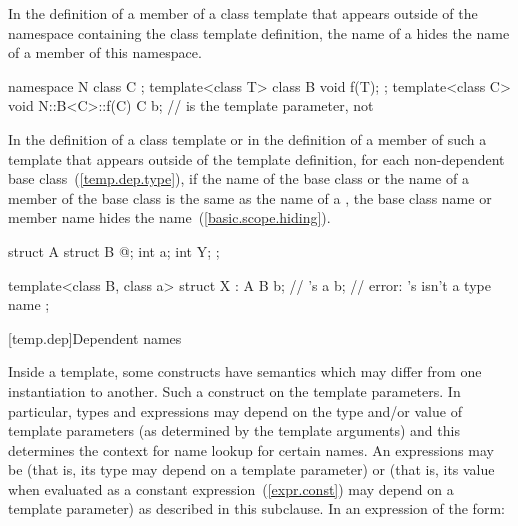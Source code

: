 \pnum
In the definition of a member of a class template that appears outside of the
namespace containing the class template definition,
the name of a
hides the name of a member of this namespace.
\begin{example}

\begin{codeblock}
namespace N {
  class C { };
  template<class T> class B {
    void f(T);
  };
}
template<class C> void N::B<C>::f(C) {
  C b;              //  is the template parameter, not 
}
\end{codeblock}
\end{example}

\pnum
In the definition of a class template or in the definition of a member of such
a template that appears outside of the template definition,
for each non-dependent base class~(\ref{temp.dep.type}),
if the name of the base class
or the name of a member of the
base class is the same as the name of a
,
the base class name or member name hides the
name~(\ref{basic.scope.hiding}).
\begin{example}

\begin{codeblock}
struct A {
  struct B { @\commentellip@ };
  int a;
  int Y;
};

template<class B, class a> struct X : A {
  B b;              // 's 
  a b;              // error: 's  isn't a type name
};
\end{codeblock}
\end{example}

[temp.dep]{Dependent names}

\pnum
{}%
Inside a template, some constructs have semantics which may differ from one
instantiation to another.
Such a construct
on the template parameters.
In particular, types and expressions may depend on the type
and/or
value of
template parameters (as determined by the template arguments) and this determines
the context for name lookup for certain names.
An expressions may be
(that is, its type may depend on a template parameter) or
(that is, its value when evaluated as a constant expression~(\ref{expr.const})
may depend on a template parameter)
as described in this subclause.
In an expression of the form:

